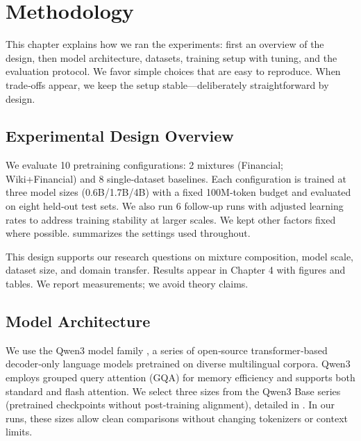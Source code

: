 \chapter{Methodology}

This chapter explains how we ran the experiments: first an overview of the design, then model architecture, datasets, training setup with tuning, and the evaluation protocol. We favor simple choices that are easy to reproduce. When trade‑offs appear, we keep the setup stable—deliberately straightforward by design.

\section{Experimental Design Overview}

We evaluate 10 pretraining configurations: 2 mixtures (Financial; Wiki+Financial) and 8 single‑dataset baselines. Each configuration is trained at three model sizes (0.6B/1.7B/4B) with a fixed 100M‑token budget and evaluated on eight held‑out test sets. We also run 6 follow‑up runs with adjusted learning rates to address training stability at larger scales. We kept other factors fixed where possible.  summarizes the settings used throughout.



This design supports our research questions on mixture composition, model scale, dataset size, and domain transfer. Results appear in Chapter 4 with figures and tables. We report measurements; we avoid theory claims.

\section{Model Architecture}

We use the Qwen3 model family \parencite{yang2024qwen2,qwen3}, a series of open‑source transformer‑based decoder‑only language models pretrained on diverse multilingual corpora. Qwen3 employs grouped query attention (GQA) for memory efficiency and supports both standard and flash attention. We select three sizes from the Qwen3 Base series (pretrained checkpoints without post‑training alignment), detailed in . In our runs, these sizes allow clean comparisons without changing tokenizers or context limits.

